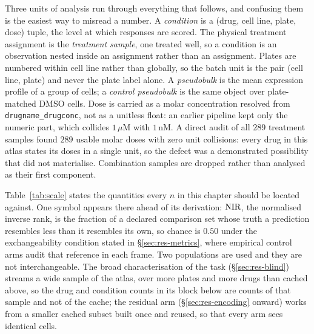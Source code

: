Three units of analysis run through everything that follows, and confusing them is the easiest way
to misread a number. A \emph{condition} is a (drug, cell line, plate, dose) tuple, the level at
which responses are scored. The physical treatment assignment is the \emph{treatment sample}, one
treated well, so a condition is an observation nested inside an assignment rather than an
assignment. Plates are numbered within cell line rather than globally, so the batch unit is the pair
(cell line, plate) and never the plate label alone. A \emph{pseudobulk} is the mean expression
profile of a group of cells; a \emph{control pseudobulk} is the same object over plate-matched DMSO
cells. Dose is carried as a molar concentration resolved from \texttt{drugname\_drugconc}, not as a
unitless float: an earlier pipeline kept only the numeric part, which collides $1\,\mu$M with
$1\,$nM. A direct audit of all $289$ treatment samples found $289$ usable molar doses with zero unit
collisions: every drug in this atlas states its doses in a single unit, so the defect was a
demonstrated possibility that did not materialise. Combination samples are dropped rather than
analysed as their first component.

Table~\ref{tab:scale} states the quantities every $n$ in this chapter should be located against.
One symbol appears there ahead of its derivation: $\textrm{NIR}$, the normalised inverse rank, is the
fraction of a declared comparison set whose truth a prediction resembles less than it resembles its
own, so chance is $0.50$ under the exchangeability condition stated in
\S\ref{sec:res-metrics}, where empirical control arms audit that reference in each frame.
Two populations are used and they are not interchangeable. The broad characterisation of the task
(\S\ref{sec:res-blind}) streams a wide sample of the atlas, over more plates and more drugs than
cached above, so the drug and condition counts in its block below are counts of that
sample and not of the cache; the residual arm (\S\ref{sec:res-encoding} onward) works from a
smaller cached subset built once and reused, so that
every arm sees identical cells.

